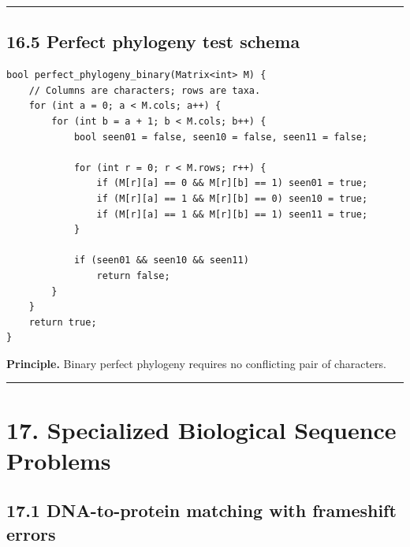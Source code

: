 \documentclass[11pt]{article}
\begin{document}
\begin{center}\rule{0.5\linewidth}{0.5pt}\end{center}

\subsection{16.5 Perfect phylogeny test schema}\label{perfect-phylogeny-test-schema}

\begin{verbatim}
bool perfect_phylogeny_binary(Matrix<int> M) {
    // Columns are characters; rows are taxa.
    for (int a = 0; a < M.cols; a++) {
        for (int b = a + 1; b < M.cols; b++) {
            bool seen01 = false, seen10 = false, seen11 = false;

            for (int r = 0; r < M.rows; r++) {
                if (M[r][a] == 0 && M[r][b] == 1) seen01 = true;
                if (M[r][a] == 1 && M[r][b] == 0) seen10 = true;
                if (M[r][a] == 1 && M[r][b] == 1) seen11 = true;
            }

            if (seen01 && seen10 && seen11)
                return false;
        }
    }
    return true;
}
\end{verbatim}

\textbf{Principle.} Binary perfect phylogeny requires no conflicting pair of characters.

\begin{center}\rule{0.5\linewidth}{0.5pt}\end{center}

\section{17. Specialized Biological Sequence Problems}\label{specialized-biological-sequence-problems}

\subsection{17.1 DNA-to-protein matching with frameshift errors}\label{dna-to-protein-matching-with-frameshift-errors}
\end{document}
